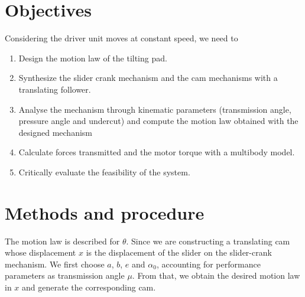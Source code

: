 \documentclass[12pt]{scrartcl}
\begin{document}
\section{Objectives}
Considering the driver unit moves at constant speed, we need to 
\begin{enumerate}[i]
	\item Design the motion law of the tilting pad.
	\item Synthesize the slider crank mechanism and the cam mechanisms with a translating follower.
	\item Analyse the mechanism through kinematic parameters (transmission angle, pressure angle and undercut) and compute the motion law obtained with the designed mechanism
	\item Calculate forces transmitted and the motor torque with a multibody model.
	\item Critically evaluate the feasibility of the system.
\end{enumerate}

\section{Methods and procedure}
The motion law is described for $\theta$. Since we are constructing a translating cam whose displacement $x$ is the displacement of the slider on the slider-crank mechanism. We first choose $a$, $b$, $e$ and $\alpha_0$, accounting for performance parameters as transmission angle $\mu$. From that, we obtain the desired motion law in $x$ and generate the corresponding cam.  
\end{document}
